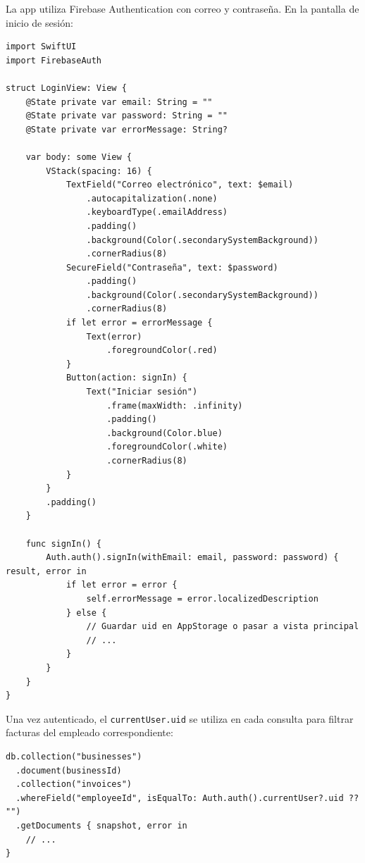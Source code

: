 \begin{large}

La app utiliza Firebase Authentication con correo y contraseña. En la pantalla de inicio de sesión:

\begin{verbatim}
import SwiftUI
import FirebaseAuth

struct LoginView: View {
    @State private var email: String = ""
    @State private var password: String = ""
    @State private var errorMessage: String?

    var body: some View {
        VStack(spacing: 16) {
            TextField("Correo electrónico", text: $email)
                .autocapitalization(.none)
                .keyboardType(.emailAddress)
                .padding()
                .background(Color(.secondarySystemBackground))
                .cornerRadius(8)
            SecureField("Contraseña", text: $password)
                .padding()
                .background(Color(.secondarySystemBackground))
                .cornerRadius(8)
            if let error = errorMessage {
                Text(error)
                    .foregroundColor(.red)
            }
            Button(action: signIn) {
                Text("Iniciar sesión")
                    .frame(maxWidth: .infinity)
                    .padding()
                    .background(Color.blue)
                    .foregroundColor(.white)
                    .cornerRadius(8)
            }
        }
        .padding()
    }

    func signIn() {
        Auth.auth().signIn(withEmail: email, password: password) { result, error in
            if let error = error {
                self.errorMessage = error.localizedDescription
            } else {
                // Guardar uid en AppStorage o pasar a vista principal
                // ...
            }
        }
    }
}
\end{verbatim}

Una vez autenticado, el \texttt{currentUser.uid} se utiliza en cada consulta para filtrar facturas del empleado correspondiente:

\begin{verbatim}
db.collection("businesses")
  .document(businessId)
  .collection("invoices")
  .whereField("employeeId", isEqualTo: Auth.auth().currentUser?.uid ?? "")
  .getDocuments { snapshot, error in
    // ...
}
\end{verbatim}

\end{large}

